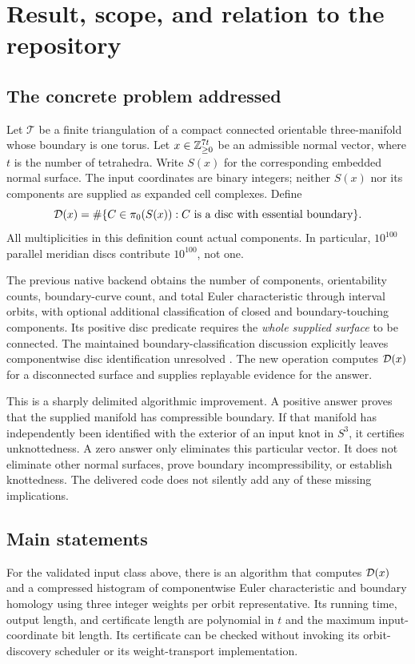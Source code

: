 \section{Result, scope, and relation to the repository}\label{sec:results}

\subsection{The concrete problem addressed}

Let $\mathcal T$ be a finite triangulation of a compact connected orientable
three-manifold whose boundary is one torus. Let $x\in\mathbb Z_{\geq0}^{7t}$ be an
admissible normal vector, where $t$ is the number of tetrahedra. Write $S(x)$
for the corresponding embedded normal surface. The input coordinates are
binary integers; neither $S(x)$ nor its components are supplied as expanded
cell complexes. Define
\[
  \mathcal D(x)=\#\{C\in\pi_0(S(x)):C\text{ is a disc with essential boundary}\}.
\]
All multiplicities in this definition count actual components. In particular,
$10^{100}$ parallel meridian discs contribute $10^{100}$, not one.

The previous native backend obtains the number of components, orientability
counts, boundary-curve count, and total Euler characteristic through interval
orbits, with optional additional classification of closed and boundary-touching
components. Its positive disc predicate requires the \emph{whole supplied
surface} to be connected. The maintained boundary-classification discussion
explicitly leaves componentwise disc identification unresolved
\cite{ProveItSnapshot}. The new operation computes $\mathcal D(x)$ for a disconnected
surface and supplies replayable evidence for the answer.

This is a sharply delimited algorithmic improvement. A positive answer proves
that the supplied manifold has compressible boundary. If that manifold has
independently been identified with the exterior of an input knot in $S^3$, it
certifies unknottedness. A zero answer only eliminates this particular vector.
It does not eliminate other normal surfaces, prove boundary incompressibility,
or establish knottedness. The delivered code does not silently add any of
these missing implications.

\subsection{Main statements}

\begin{theorem}\label{thm:main-disc}
For the validated input class above, there is an algorithm that computes
$\mathcal D(x)$ and a compressed histogram of componentwise Euler characteristic and
boundary homology using three integer weights per orbit representative.
Its running time, output length, and certificate length are polynomial in
$t$ and the maximum input-coordinate bit length. Its certificate can be
checked without invoking its orbit-discovery scheduler or its weight-transport
implementation.
\end{theorem}

